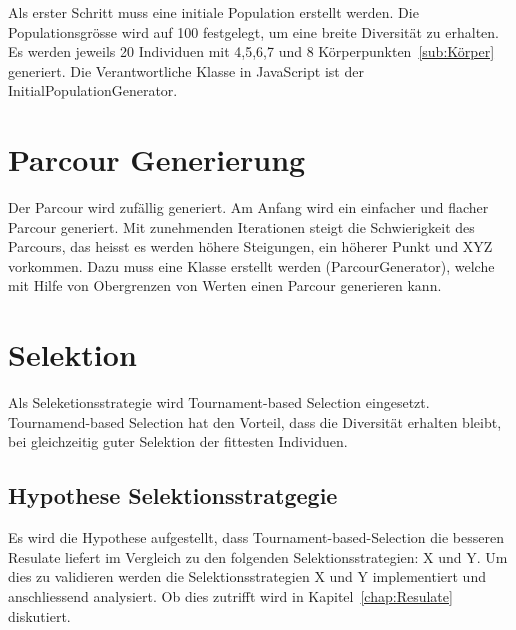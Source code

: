     Als erster Schritt muss eine initiale Population erstellt werden. Die Populationsgrösse wird auf 100 festgelegt,
    um eine breite Diversität zu erhalten.
    Es werden jeweils 20 Individuen mit 4,5,6,7 und 8 Körperpunkten~\ref{sub:Körper} generiert.
    Die Verantwortliche Klasse in JavaScript ist der InitialPopulationGenerator.

  \section{Parcour Generierung\label{sec:Parcour Generierung}}

    Der Parcour wird zufällig generiert. Am Anfang wird ein einfacher und flacher Parcour generiert.
    Mit zunehmenden Iterationen steigt die Schwierigkeit des Parcours, das heisst es werden höhere Steigungen, ein höherer Punkt und XYZ vorkommen.
    Dazu muss eine Klasse erstellt werden (ParcourGenerator), welche mit Hilfe von Obergrenzen von Werten einen Parcour generieren kann.

  \section{Selektion\label{sec:Selektion}}

    Als Seleketionsstrategie wird Tournament-based Selection eingesetzt. Tournamend-based Selection hat den Vorteil,
    dass die Diversität erhalten bleibt, bei gleichzeitig guter Selektion der fittesten Individuen.

    \subsection{Hypothese Selektionsstratgegie\label{sub:Hypothese Selektionsstratgegie}}

      Es wird die Hypothese aufgestellt, dass Tournament-based-Selection die besseren Resulate liefert im Vergleich zu den folgenden Selektionsstrategien: X und Y.
      Um dies zu validieren werden die Selektionsstrategien X und Y implementiert und anschliessend analysiert.
      Ob dies zutrifft wird in Kapitel~\ref{chap:Resulate} diskutiert.
